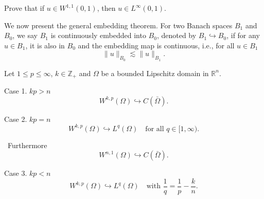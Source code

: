 \begin{exe}\label{exercise:20180304-1}
Prove that if $u\in W^{1,1}(0, 1)$, then $u \in L^{\infty}(0, 1)$.
\end{exe}

We now present the general embedding theorem. For two Banach spaces $B_1$ and $B_0$, we
say $B_1$ is continuously embedded into $B_0$, denoted by $B_1\hookrightarrow B_0$, if for any $u\in B_1$, it is also in $B_0$ and the embedding map is continuous, i.e., for all $u\in B_1$
\[
\|u\|_{B_0}\lesssim \|u\|_{B_1}.
\]

\begin{theorem}
Let $1\leq p\leq \infty$, $k\in\mathbb Z_+$ and $\Omega$ be a
bounded Lipschitz domain in $\mathbb R^n$.


\noindent Case 1. $kp>n$
\[
W^{k,p}(\Omega)\hookrightarrow C(\bar{\Omega}).
\]

\noindent Case 2. $kp=n$
\[
W^{k,p}(\Omega)\hookrightarrow L^q(\Omega)\quad \textrm{for all } q\in[1,\infty).
\]

\quad\;\, Furthermore
\[
W^{n,1}(\Omega)\hookrightarrow C(\bar{\Omega}).
\]

\noindent Case 3. $kp<n$
\[
W^{k,p}(\Omega)\hookrightarrow L^q(\Omega)\quad \textrm{with } \frac{1}{q}=\frac{1}{p}-\frac{k}{n}.
\]
\end{theorem}

